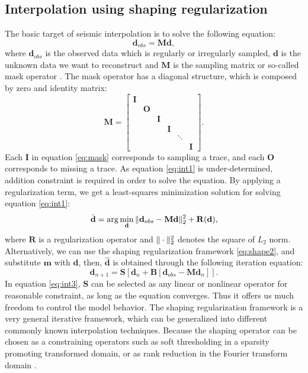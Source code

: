 \subsection{Interpolation using shaping regularization}
The basic target of seismic interpolation is to solve the following equation:
\begin{equation}
\label{eq:int1}
\mathbf{d}_{obs}=\mathbf{Md},
\end{equation}
where $\mathbf{d}_{obs}$ is the observed data which is regularly or irregularly sampled, $\mathbf{d}$ is the unknown data we want to reconstruct and $\mathbf{M}$ is the sampling matrix \cite[]{liubin2004} or so-called mask operator \cite[]{liu,mostafa2010}. The mask operator has a diagonal structure, which is composed by zero and identity matrix:
\begin{equation}
\label{eq:mask}
\mathbf{M} = \left[\begin{array}{cccccccc} 
\mathbf{I} & 	       & 	  & 	     &		 &	\\
	   &\mathbf{O} & 	  &	     &		 &	\\
	   &           &\mathbf{I}&	     &		 &	\\
	   &  	       &          &\mathbf{I}&	         & 	\\
	   &	       &	  &	     &\mathbf{\ddots} & \\
	   &	       &	  &	     &		 & \mathbf{I} 
\end{array}\right].
\end{equation}
Each $\mathbf{I}$ in equation \ref{eq:mask} corresponds to sampling a trace, and each $\mathbf{O}$ corresponds to missing a trace.
As equation \ref{eq:int1} is under-determined, addition constraint is required in order to solve the equation. By applying a regularization term, we get a least-squares minimization solution for solving equation \ref{eq:int1}:
\begin{equation}
\label{eq:int2}
\hat{\mathbf{d}}=\arg\min_{\mathbf{d}}\Arrowvert \mathbf{d}_{obs}-\mathbf{Md}\Arrowvert_2^2+\mathbf{R}(\mathbf{d}),
\end{equation}
where $\mathbf{R}$ is a regularization operator and $\Arrowvert\cdot\Arrowvert_2^2$ denotes the square of $L_2$ norm.
Alternatively, we can use the shaping regularization framework \ref{eq:shape2}, and substitute $\mathbf{m}$ with $\mathbf{d}$, then, $\hat{\mathbf{d}}$ is obtained through the following iteration equation:
\begin{equation}
\label{eq:int3}
\mathbf{d}_{n+1}=\mathbf{S}\left[\mathbf{d}_n+\mathbf{B}[\mathbf{d}_{obs}-\mathbf{Md}_n]\right].
\end{equation}
In equation \ref{eq:int3}, $\mathbf{S}$ can be selected as any linear or nonlinear operator for reasonable constraint, as long as the equation converges. Thus it offers us much freedom to control the model behavior. The shaping regularization framework is a very general iterative framework, which can be generalized into different commonly known interpolation techniques. Because the shaping operator can be chosen as a constraining operators such as soft thresholding in a sparsity promoting transformed domain, or as rank reduction in the Fourier transform domain \cite[]{mssa}.

